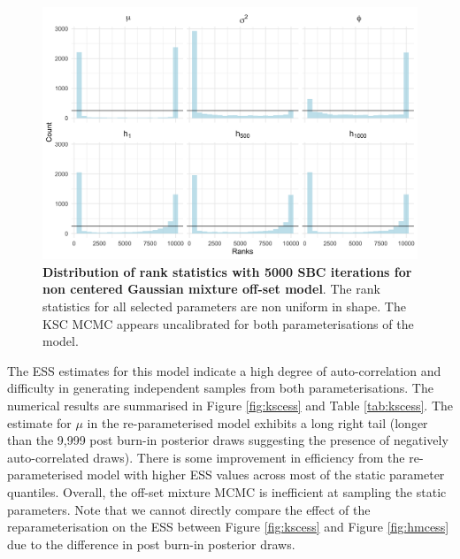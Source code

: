 \documentclass[12pt, a4paper]{article}
\begin{document}
    \begin{figure}[H]
        \centering
        \includegraphics[scale=0.09]{results/ksc_ncp_5k.png}
        \caption{\textbf{Distribution of rank statistics with 5000 SBC iterations for non centered Gaussian mixture off-set model}. The rank statistics for all selected parameters are non uniform in shape. The KSC MCMC appears uncalibrated for both parameterisations of the model.}
        \label{fig:ncpksc5k}
    \end{figure}

    The ESS estimates for this model indicate a high degree of auto-correlation and difficulty in generating independent samples from both parameterisations. The numerical results are summarised in Figure \ref{fig:kscess} and Table \ref{tab:kscess}. The estimate for $\mu$ in the re-parameterised model exhibits a long right tail (longer than the 9,999 post burn-in posterior draws suggesting the presence of negatively auto-correlated draws). There is some improvement in efficiency from the re-parameterised model with higher ESS values across most of the static parameter quantiles. Overall, the off-set mixture MCMC is inefficient at sampling the static parameters. Note that we cannot directly compare the effect of the reparameterisation on the ESS between Figure \ref{fig:kscess} and Figure \ref{fig:hmcess} due to the difference in post burn-in posterior draws.
    
\end{document}
